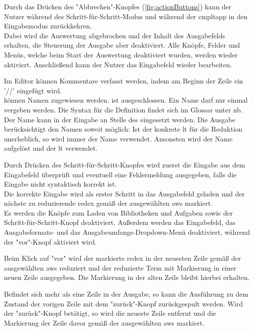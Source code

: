 \documentclass[parskip=full,11pt,twoside]{scrartcl}
\begin{document}
Durch das Drücken des "Abbrechen"-Knopfes (\cref{fig:actionButtons}) kann der Nutzer während des Schritt-für-Schritt-Modus und während der \gls{cmpltapp} in den Eingabemodus zurückkehren.\\
Dabei wird die Auswertung abgebrochen und der Inhalt des Ausgabefelds erhalten, die Steuerung der Ausgabe aber deaktiviert.
Alle Knöpfe, Felder und Menüs, welche beim Start der Auswertung deaktiviert wurden, werden wieder aktiviert.
Anschließend kann der Nutzer das Eingabefeld wieder bearbeiten.

Im Editor können Kommentare verfasst werden, 
indem am Beginn der Zeile ein '//' eingefügt wird.\\
 können Namen zugewiesen werden.
 ist ausgeschlossen. Ein Name darf nur einmal vergeben werden.
Die Syntax für die Definition findet sich im Glossar unter \gls{nb}.
Der Name kann in der Eingabe an Stelle des  eingesetzt werden.
Die Ausgabe berücksichtigt den Namen soweit möglich:
Ist der konkrete \gls{lt} für die Reduktion unerheblich, so wird immer der Name verwendet.
Ansonsten wird der Name aufgelöst und der \gls{lt} verwendet.

Durch Drücken des Schritt-für-Schritt-Knopfes wird zuerst die Eingabe aus dem Eingabefeld überprüft und eventuell eine Fehlermeldung ausgegeben, falls die Eingabe nicht syntaktisch korrekt ist. \\
Die korrekte Eingabe wird als erster Schritt in das Ausgabefeld geladen und der nächste zu reduzierende \gls{redex} gemäß der ausgewählten \gls{aws} markiert. \\
Es werden die Knöpfe zum Laden von Bibliotheken und Aufgaben sowie der Schritt-für-Schritt-Knopf deaktiviert.
Außerdem werden das Eingabefeld, das Ausgabeformats- und das Ausgabeumfangs-Dropdown-Menü deaktiviert, während der "vor"-Knopf aktiviert wird.

Beim Klick auf "vor" wird der markierte \gls{redex} in der neuesten Zeile gemäß der ausgewählten \gls{aws} reduziert und der reduzierte Term mit Markierung in einer neuen Zeile ausgegeben.
Die Markierung in der alten Zeile bleibt hierbei erhalten.

Befindet sich mehr als eine Zeile in der Ausgabe, so kann die Ausführung zu dem Zustand der vorigen Zeile mit dem "zurück"-Knopf zurückgespult werden.
Wird der "zurück"-Knopf betätigt, so wird die neueste Zeile entfernt und die Markierung der Zeile davor gemäß der ausgewählten \gls{aws} markiert.
\end{document}
